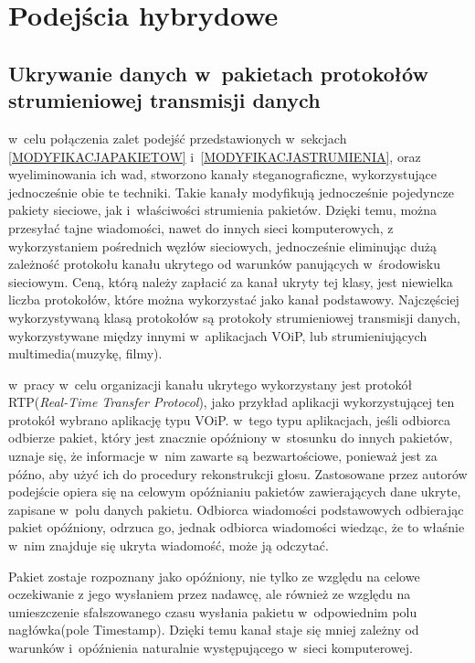 \documentclass[a4paper, twoside, 12pt]{report}
\begin{document}
    \section{Podejścia hybrydowe}
        \subsection{Ukrywanie danych w~pakietach protokołów strumieniowej transmisji danych}
        w~celu połączenia zalet podejść przedstawionych w~sekcjach
        \ref{MODYFIKACJAPAKIETOW} i~\ref{MODYFIKACJASTRUMIENIA}, oraz wyeliminowania
        ich wad, stworzono kanały steganograficzne, wykorzystujące jednocześnie obie te
        techniki. Takie kanały modyfikują jednocześnie pojedyncze pakiety sieciowe,
        jak i~właściwości strumienia pakietów. Dzięki temu, można przesyłać tajne wiadomości,
        nawet do innych sieci komputerowych, z wykorzystaniem pośrednich węzłów sieciowych,
        jednocześnie eliminując dużą zależność protokołu kanału ukrytego od warunków
        panujących w~środowisku sieciowym. Ceną, którą należy zapłacić za kanał
        ukryty tej klasy, jest niewielka liczba protokołów, które można wykorzystać
        jako kanał podstawowy. Najczęściej wykorzystywaną klasą protokołów są
        protokoły strumieniowej transmisji danych, wykorzystywane między innymi
        w~aplikacjach VOiP, lub strumieniujących multimedia(muzykę, filmy).

        w~pracy \cite{VOIPSTEGANOGRAPHY} w~celu organizacji kanału ukrytego wykorzystany
        jest protokół RTP(\emph{Real-Time Transfer Protocol}), jako przykład aplikacji
        wykorzystującej ten protokół wybrano aplikację typu VOiP. w~tego typu aplikacjach,
        jeśli odbiorca odbierze pakiet, który jest znacznie opóźniony w~stosunku
        do innych pakietów, uznaje się, że informacje w~nim zawarte są bezwartościowe,
        ponieważ jest za późno, aby użyć ich do procedury rekonstrukcji głosu.
        Zastosowane przez autorów podejście opiera się na celowym opóźnianiu pakietów
        zawierających dane ukryte, zapisane w~polu danych pakietu.
        Odbiorca wiadomości podstawowych odbierając pakiet
        opóźniony, odrzuca go, jednak odbiorca wiadomości wiedząc, że to właśnie
        w~nim znajduje się ukryta wiadomość, może ją odczytać.

        Pakiet zostaje rozpoznany jako opóźniony, nie tylko ze względu na celowe
        oczekiwanie z jego wysłaniem przez nadawcę, ale również ze względu
        na umieszczenie sfałszowanego czasu wysłania pakietu w~odpowiednim
        polu nagłówka(pole Timestamp). Dzięki temu kanał staje się mniej zależny
        od warunków i~opóźnienia naturalnie występującego w~sieci komputerowej.
\end{document}
